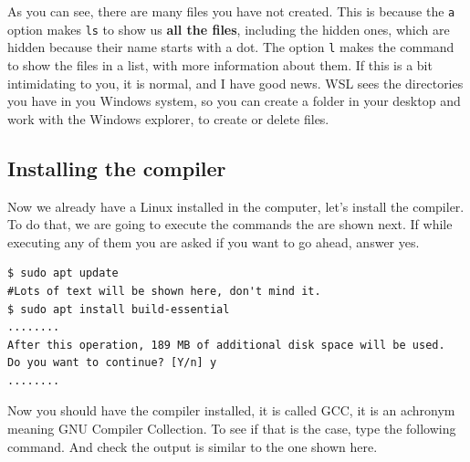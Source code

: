 \documentclass[a4paper]{article}
\begin{document}
As you can see, there are many files you have not created. This is because the
\verb!a! option makes \verb!ls! to show us \textbf{all the files}, including the
hidden ones, which are hidden because their name starts with a dot. The option
\verb!l! makes the command to show the files in a list, with more information
about them. If this is a bit intimidating to you, it is normal, and I have good
news. WSL sees the directories you have in you Windows system, so you can create
a folder in your desktop and work with the Windows explorer, to create or delete
files.

\subsection{Installing the compiler}
Now we already have a Linux installed in the computer, let's install the
compiler. To do that, we are going to execute the commands the are shown next.
If while executing any of them you are asked if you want to go ahead, answer
yes.

\noindent
\begin{minipage}[H]{\linewidth}
\mbox{}
\begin{lstlisting}[style=terminalStyle]
$ sudo apt update
#Lots of text will be shown here, don't mind it.
$ sudo apt install build-essential
........
After this operation, 189 MB of additional disk space will be used.
Do you want to continue? [Y/n] y
........
\end{lstlisting}
\end{minipage}

Now you should have the compiler installed, it is called GCC, it is an achronym
meaning GNU Compiler Collection. To see if that is the case, type the following
command. And check the output is similar to the one shown here.
\end{document}
